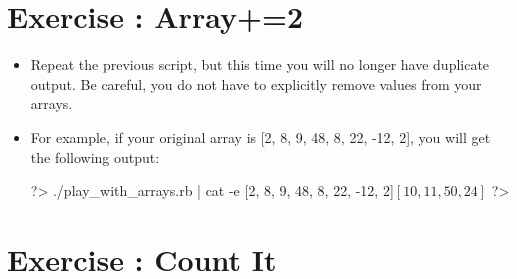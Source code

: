 \documentclass{42-en}
\begin{document}


\chapter{Exercise \exercicenumber: Array+=2}

\exnumber{\exercicenumber}


\begin{itemize}

\item Repeat the previous script, but this time you will no longer have duplicate output. Be careful, you do not have to explicitly remove values from your arrays.

\item For example, if your original array is [2, 8, 9, 48, 8, 22, -12, 2], you will get the following output: 
\begin{42console}
	?> ./play_with_arrays.rb | cat -e
	[2, 8, 9, 48, 8, 22, -12, 2]$
	[10, 11, 50, 24]$
	?>
\end{42console}

\end{itemize}



\chapter{Exercise \exercicenumber: Count It}

\exnumber{\exercicenumber}
\end{document}

